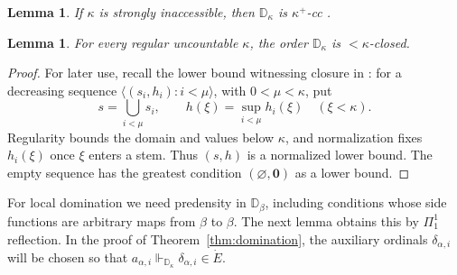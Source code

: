 \documentclass[11pt,a4paper]{amsart}
\newtheorem{lemma}[theorem]{Lemma}
\theoremstyle{definition}
\theoremstyle{remark}
\newcommand{\D}{\mathbb D}
\begin{document}
\begin{samepage}
\begin{lemma}\label{lem:hechler-cc}
If \(\kappa\) is strongly inaccessible, then \(\D_\kappa\) is
\(\kappa^+\)-cc \cite[Section~4.2]{BBFM}.
\end{lemma}
\end{samepage}

\begin{lemma}\label{lem:hechler-closure}
For every regular uncountable \(\kappa\), the order
\(\D_\kappa\) is \(<\kappa\)-closed.
\end{lemma}
\begin{proof}
For later use, recall the lower bound witnessing closure in
\cite[Section~4.2]{BBFM}: for a decreasing sequence
\(\langle(s_i,h_i):i<\mu\rangle\), with \(0<\mu<\kappa\), put
\[
 s=\bigcup_{i<\mu}s_i,\qquad
 h(\xi)=\sup_{i<\mu}h_i(\xi)\quad(\xi<\kappa).
\]
Regularity bounds the domain and values below \(\kappa\), and
normalization fixes \(h_i(\xi)\) once \(\xi\) enters a stem.
Thus \((s,h)\) is a normalized lower bound. The empty sequence
has the greatest condition \((\varnothing,\mathbf0)\) as a
lower bound.
\end{proof}

For local domination we need predensity in \(\D_\beta\), including
conditions whose side functions are arbitrary maps from \(\beta\)
to \(\beta\). The next lemma obtains this by \(\Pi^1_1\)
reflection. In the proof of Theorem~\ref{thm:domination}, the
auxiliary ordinals \(\delta_{\alpha,i}\) will be chosen so that
\(a_{\alpha,i}\Vdash_{\D_\kappa}\delta_{\alpha,i}\in\dot E\).
\end{document}
